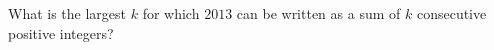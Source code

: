 What is the largest $k$ for which $2013$ can be written as a sum of $k$ consecutive positive integers?
